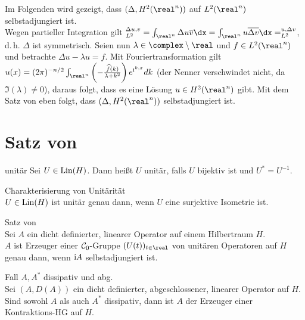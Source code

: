 \linie

\begin{Bsp}
    Im Folgenden wird gezeigt, dass $(\Delta, H^2(\real^n))$ auf $L^2(\real^n)$
    selbstadjungiert ist.\\
    Wegen partieller Integration gilt
    $\sp{\Delta u, v}_{L^2} = \int_{\real^n} \Delta u \overline{v} \dx
    = \int_{\real^n} u \overline{\Delta v} \dx = \sp{u, \Delta v}_{L^2}$,
    d.\,h. $\Delta$ ist symmetrisch.
    Seien nun $\lambda \in \complex \setminus \real$ und $f \in L^2(\real^n)$ und
    betrachte $\Delta u - \lambda u = f$.
    Mit Fouriertransformation gilt
    $u(x) = (2\pi)^{-n/2} \int_{\real^n}
    \left(-\frac{\widehat{f}(k)}{\lambda + k^2}\right) e^{\iu\sp{k, x}} dk$
    (der Nenner verschwindet nicht, da $\Im(\lambda) \not= 0$),
    daraus folgt, dass es eine Lösung $u \in H^2(\real^n)$ gibt.
    Mit dem Satz von eben folgt, dass $(\Delta, H^2(\real^n))$ selbstadjungiert ist.
\end{Bsp}

\pagebreak

\section{%
    Satz von %
}

\begin{Def}{unitär}
    Sei $U \in \operatorname{Lin}(H)$.
    Dann heißt $U$ unitär, falls $U$ bijektiv ist und $U^\ast = U^{-1}$.
\end{Def}

\begin{Lemma}{Charakterisierung von Unitärität}\\
    $U \in \operatorname{Lin}(H)$ ist unitär genau dann,
    wenn $U$ eine surjektive Isometrie ist.
\end{Lemma}

\begin{Satz}{Satz von }\\
    Sei $A$ ein dicht definierter, linearer Operator auf einem Hilbertraum $H$.\\
    $A$ ist Erzeuger einer $\mathcal{C}_0$-Gruppe $(U(t))_{t \in \real}$ von unitären Operatoren
    auf $H$ genau dann, wenn $\mathrm{i} A$ selbstadjungiert ist.
\end{Satz}

\begin{Lemma}{Fall $A, A^\ast$ dissipativ und abg.}\\
    Sei $(A, D(A))$ ein dicht definierter, abgeschlossener, linearer Operator auf $H$.\\
    Sind sowohl $A$ als auch $A^\ast$ dissipativ, dann ist $A$ der Erzeuger einer
    Kontraktions-HG auf $H$.
\end{Lemma}


